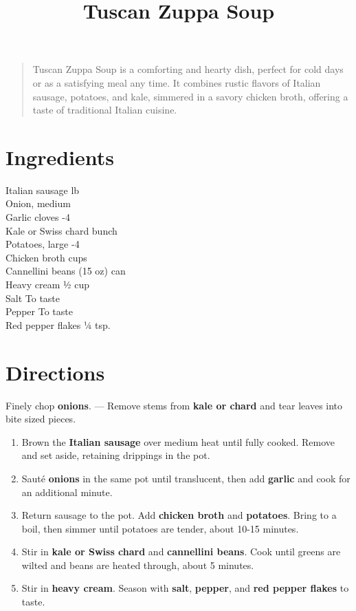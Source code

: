 \documentclass[11pt,letterpaper]{article}
\title{Tuscan Zuppa Soup}
\author{}
\date{}
\begin{document}
\maketitle

\begin{quote}
\small
\begin{em}
Tuscan Zuppa Soup is a comforting and hearty dish, perfect for cold days or as a satisfying meal any time. It combines rustic flavors of Italian sausage, potatoes, and kale, simmered in a savory chicken broth, offering a taste of traditional Italian cuisine.
\end{em}
\end{quote}

\section*{Ingredients}
\setlength{\columnsep}{20pt}
\begin{multicols}{2}
\noindent
    Italian sausage  lb \\
    Onion, medium  \\
    Garlic cloves -4 \\
    Kale or Swiss chard  bunch \\
    Potatoes, large -4 \\
    \columnbreak
    Chicken broth  cups \\
    Cannellini beans  (15 oz) can \\
    Heavy cream \dotfill ½ cup \\
    Salt \dotfill To taste \\
    Pepper \dotfill To taste \\
    Red pepper flakes \dotfill ¼ tsp.
\end{multicols}

\section*{Directions}

\noindent
Finely chop \textbf{onions}. --- 
Remove stems from \textbf{kale or chard} and tear leaves into bite sized pieces.

\begin{enumerate}
    \item Brown the \textbf{Italian sausage} over medium heat until fully cooked. Remove and set aside, retaining drippings in the pot.
    \item Sauté \textbf{onions} in the same pot until translucent, then add \textbf{garlic} and cook for an additional minute.
    \item Return sausage to the pot. Add \textbf{chicken broth} and \textbf{potatoes}. Bring to a boil, then simmer until potatoes are tender, about 10-15 minutes.
    \item Stir in \textbf{kale or Swiss chard} and \textbf{cannellini beans}. Cook until greens are wilted and beans are heated through, about 5 minutes.
    \item Stir in \textbf{heavy cream}. Season with \textbf{salt}, \textbf{pepper}, and \textbf{red pepper flakes} to taste.
\end{enumerate}
\end{document}
